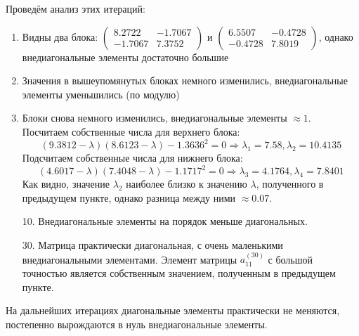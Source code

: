 \documentclass[a4paper,12pt,notitlepage,pdftex,headsepline]{scrartcl}
\begin{document}
Проведём анализ этих итераций:
\begin{enumerate}
\item Видны два блока: $\left(\begin{matrix}
8.2722 & -1.7067\\
-1.7067 & 7.3752
\end{matrix}\right)$ и $\left(\begin{matrix}
6.5507 & -0.4728\\
-0.4728 & 7.8019
\end{matrix}\right)$, однако внедиагональные элементы достаточно большие
\item Значения в вышеупомянутых блоках немного изменились, внедиагональные элементы уменьшились (по модулю)
\item Блоки снова немного изменились, внедиагональные элементы $\approx 1$.
Посчитаем собственные числа для верхнего блока:
\[\left(9.3812 - \lambda\right)\left(8.6123 - \lambda\right) - 1.3636^2 = 0 \Rightarrow \lambda_1 = 7.58, \lambda_2 = 10.4135\]
Подсчитаем собственные числа для нижнего блока:
\[\left(4.6017 - \lambda\right)\left(7.4048 - \lambda\right) - 1.1717^2 = 0 \Rightarrow \lambda_3 = 4.1764, \lambda_4 = 7.8401\]
Как видно, значение $\lambda_2$ наиболее близко к значению $\lambda$, полученного в предыдущем пункте, однако разница между ними $\approx 0.07$.
\item[10.] Внедиагональные элементы на порядок меньше диагональных.
\item[30.] Матрица практически диагональная, с очень маленькими внедиагональными элементами. Элемент матрицы $a^{\left(30\right)}_{11}$ с большой точностью является собственным значением, полученным в предыдущем пункте.
\end{enumerate}
На дальнейших итерациях диагональные элементы практически не меняются, постепенно вырождаются в нуль внедиагональные элементы.
\newpage
\end{document}
